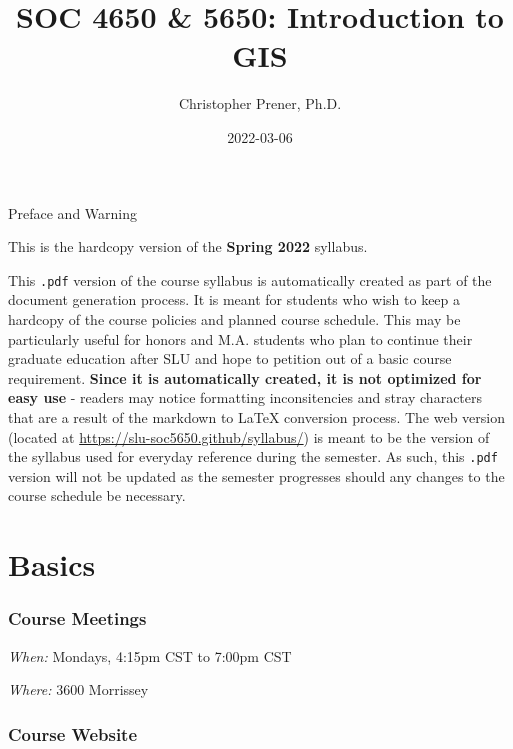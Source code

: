 \documentclass[
]{book}
\title{SOC 4650 \& 5650: Introduction to GIS}
\author{Christopher Prener, Ph.D.}
\date{2022-03-06}
\begin{document}
\maketitle

\begin{center}
{\huge Preface and Warning} \\
\end{center}
\vspace{5mm}
This is the hardcopy version of the \textbf{Spring 2022} syllabus.
\vspace{5mm}
\par \noindent This \texttt{.pdf} version of the course syllabus is automatically created as part of the document generation process. It is meant for students who wish to keep a hardcopy of the course policies and planned course schedule. This may be particularly useful for honors and M.A. students who plan to continue their graduate education after SLU and hope to petition out of a basic course requirement. \textbf{Since it is automatically created, it is not optimized for easy use} - readers may notice formatting inconsitencies and stray characters that are a result of the markdown to \LaTeX{} conversion process. The web version (located at \href{https://slu-soc5650.github/syllabus/}{https://slu-soc5650.github/syllabus/}) is meant to be the version of the syllabus used for everyday reference during the semester. As such, this \texttt{.pdf} version will not be updated as the semester progresses should any changes to the course schedule be necessary.

\hypertarget{basics}{%
\chapter*{Basics}\label{basics}}

\hypertarget{course-meetings}{%
\subsection*{Course Meetings}\label{course-meetings}}

\emph{When:} Mondays, 4:15pm CST to 7:00pm CST

\emph{Where:} 3600 Morrissey

\hypertarget{course-website}{%
\subsection*{Course Website}\label{course-website}}
\end{document}
